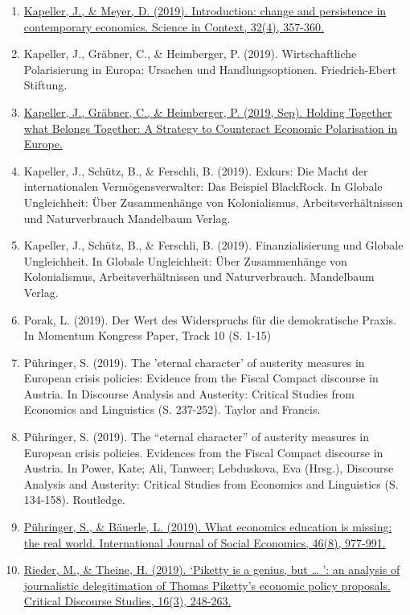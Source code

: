 \begin{enumerate}
	 \item \href{https://doi.org/10.1017/S0269889720000010}{Kapeller, J., \& Meyer, D. (2019). Introduction: change and persistence in contemporary economics. Science in Context, 32(4), 357-360.}
	 \item Kapeller, J., Gräbner, C., \& Heimberger, P. (2019). Wirtschaftliche Polarisierung in Europa: Ursachen und Handlungsoptionen. Friedrich-Ebert Stiftung.
	 \item \href{https://wiiw.ac.at/holding-together-what-belongs-together-a-strategy-to-counteract-economic-polarisation-in-europe-dlp-5026.pdf}{Kapeller, J., Gräbner, C., \& Heimberger, P. (2019, Sep). Holding Together what Belongs Together: A Strategy to Counteract Economic Polarisation in Europe.}
	 \item Kapeller, J., Schütz, B., \& Ferschli, B. (2019). Exkurs: Die Macht der internationalen Vermögensverwalter: Das Beispiel BlackRock. In Globale Ungleichheit: Über Zusammenhänge von Kolonialismus, Arbeitsverhältnissen und Naturverbrauch Mandelbaum Verlag.
	 \item Kapeller, J., Schütz, B., \& Ferschli, B. (2019). Finanzialisierung und Globale Ungleichheit. In Globale Ungleichheit: Über Zusammenhänge von Kolonialismus, Arbeitsverhältnissen und Naturverbrauch. Mandelbaum Verlag.
	 \item Porak, L. (2019). Der Wert des Widerspruchs für die demokratische Praxis. In Momentum Kongress Paper, Track 10 (S. 1-15)
	 \item Pühringer, S. (2019). The 'eternal character' of austerity measures in European crisis policies: Evidence from the Fiscal Compact discourse in Austria. In Discourse Analysis and Austerity: Critical Studies from Economics and Linguistics (S. 237-252). Taylor and Francis.
	 \item Pühringer, S. (2019). The “eternal character” of austerity measures in European crisis policies. Evidences from the Fiscal Compact discourse in Austria. In Power, Kate; Ali, Tanweer; Lebduskova, Eva (Hrsg.), Discourse Analysis and Austerity: Critical Studies from Economics and Linguistics (S. 134-158). Routledge.
	 \item \href{https://doi.org/10.1108/IJSE-04-2018-0221}{Pühringer, S., \& Bäuerle, L. (2019). What economics education is missing: the real world. International Journal of Social Economics, 46(8), 977-991.}
	 \item \href{https://doi.org/10.1080/17405904.2019.1573148}{Rieder, M., \& Theine, H. (2019). ‘Piketty is a genius, but … ’: an analysis of journalistic delegitimation of Thomas Piketty’s economic policy proposals. Critical Discourse Studies, 16(3), 248-263.}

\end{enumerate}
